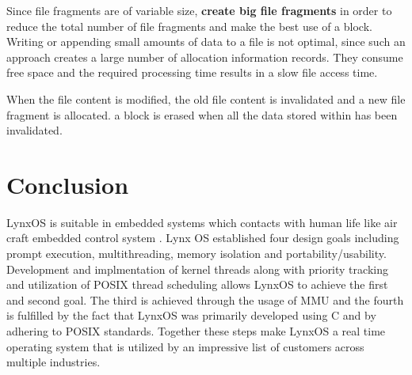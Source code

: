 \documentclass[12pt]{article}
\begin{document}
Since file fragments are of variable size, \textbf{create big file fragments} in order to reduce the total number of file fragments and make the best use of a block. Writing or appending small amounts of data to a file is not optimal, since such an approach creates a large number of allocation information records. They consume free space and the required processing time results in a slow file access time.

When the file content is modified, the old file content is invalidated and a new file fragment is allocated. a block is erased when all the data stored within has been invalidated.

\cleardoublepage

\section{Conclusion}
LynxOS is suitable in embedded systems which contacts with human life like air craft embedded control system .
Lynx OS established four design goals including prompt execution, multithreading,
memory isolation and portability/usability. Development and implmentation of kernel
threads along with priority tracking and utilization of POSIX thread scheduling allows
LynxOS to achieve the first and second goal. The third is achieved through the usage of
MMU and the fourth is fulfilled by the fact that LynxOS was primarily developed using 
C and by adhering to POSIX standards. Together these steps make LynxOS a real time
operating system that is utilized by an impressive list of customers across multiple
industries. 
\cleardoublepage



\end{document}
